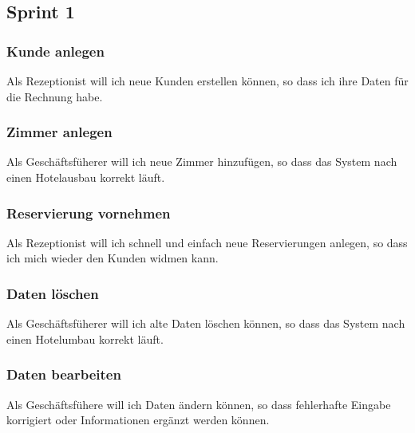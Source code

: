 \documentclass[11pt]{scrartcl}
\begin{document}
\subsection{Sprint 1}

\subsubsection{Kunde anlegen}

Als Rezeptionist will ich neue Kunden erstellen können, so dass ich ihre Daten für die Rechnung habe.

\subsubsection{Zimmer anlegen}

Als Geschäftsfüherer will ich neue Zimmer hinzufügen, so dass das System nach einen Hotelausbau korrekt läuft.

\subsubsection{Reservierung vornehmen}

Als Rezeptionist will ich schnell und einfach neue Reservierungen anlegen, so dass ich mich wieder den Kunden widmen kann.

\subsubsection{Daten löschen}

Als Geschäftsfüherer will ich alte Daten löschen können, so dass das System nach einen Hotelumbau korrekt läuft.

\subsubsection{Daten bearbeiten}

Als Geschäftsfühere will ich Daten ändern können, so dass fehlerhafte Eingabe korrigiert oder Informationen ergänzt werden können.
\end{document}
